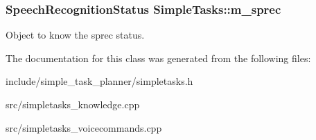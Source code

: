 \subsubsection[{\texorpdfstring{m\+\_\+sprec}{m_sprec}}]{\setlength{\rightskip}{0pt plus 5cm}Speech\+Recognition\+Status Simple\+Tasks\+::m\+\_\+sprec\hspace{0.3cm}{\ttfamily [private]}}\hypertarget{class_simple_tasks_a1459e7794f0b070486266456dbbc89c5}{}\label{class_simple_tasks_a1459e7794f0b070486266456dbbc89c5}
Object to know the sprec status. 

The documentation for this class was generated from the following files\+:\begin{DoxyCompactItemize}
\item 
include/simple\+\_\+task\+\_\+planner/simpletasks.\+h\item 
src/simpletasks\+\_\+knowledge.\+cpp\item 
src/simpletasks\+\_\+voicecommands.\+cpp\end{DoxyCompactItemize}
